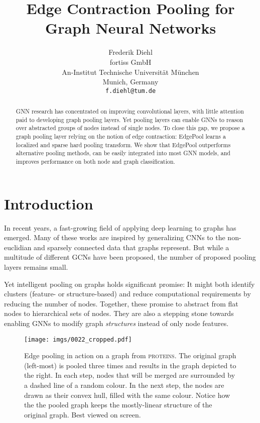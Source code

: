 \documentclass{article}
\title{Edge Contraction Pooling for Graph Neural Networks}
\author{Frederik Diehl\\
	fortiss GmbH\\
	An-Institut Technische Universität München\\
	Munich, Germany \\
	\texttt{f.diehl@tum.de} \\
	}
\newcommand{\edgepool}{EdgePool}
\newcommand{\datasetname}[1]{\textsc{#1}}
\newcommand{\proteins}{\datasetname{proteins}}
\begin{document}
\maketitle

\begin{abstract}
\gls{GNN} research has concentrated on improving convolutional layers, with little attention paid to developing graph pooling layers. Yet pooling layers can enable \glspl{GNN} to reason over abstracted groups of nodes instead of single nodes. To close this gap, we propose a graph pooling layer relying on the notion of edge contraction: \edgepool{} learns a localized and sparse hard pooling transform. We show that \edgepool{} outperforms alternative pooling methods, can be easily integrated into most \gls{GNN} models, and improves performance on both node and graph classification. \end{abstract}

\section{Introduction}

In recent years, a fast-growing field of applying deep learning to graphs has emerged. Many of these works are inspired by generalizing \glspl{CNN} to the non-euclidian and sparsely connected data that graphs represent. But while a multitude of different \glspl{GCN} have been proposed, the number of proposed pooling layers remains small. 

Yet intelligent pooling on graphs holds significant promise: It might both identify clusters (feature- or structure-based) and reduce computational requirements by reducing the number of nodes. Together, these promise to abstract from flat nodes to hierarchical sets of nodes. They are also a stepping stone towards enabling \glspl{GNN} to modify graph \textit{structures} instead of only node features.

\begin{figure}[h]
	\centering
	\texttt{[image: imgs/0022\_cropped.pdf]}
	\caption{Edge pooling in action on a graph from \proteins{}. The original graph (left-most) is pooled three times and results in the graph depicted to the right. In each step, nodes that will be merged are surrounded by a dashed line of a random colour. In the next step, the nodes are drawn as their convex hull, filled with the same colour. Notice how the the pooled graph keeps the mostly-linear structure of the original graph. Best viewed on screen.}
	\label{fig:teaser}
\end{figure}
\end{document}
